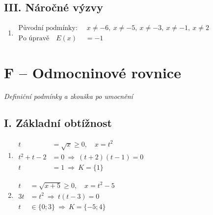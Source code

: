 \documentclass[11pt,a4paper]{article}
\begin{document}
\subsection*{III. Náročné výzvy}
\begin{enumerate}[label={},itemsep=9pt]
\item[\textbf{E002}] \(\displaystyle \begin{aligned}\text{Původní podmínky: }&\ x\ne -6,\ x\ne -5,\ x\ne -3,\ x\ne -1,\ x\ne 2\\ \text{Po úpravě}\quad E(x)&=-1\end{aligned}\)\par
\end{enumerate}
\section*{F -- Odmocninové rovnice}
\textit{Definiční podmínky a zkouška po umocnění}
\subsection*{I. Základní obtížnost}
\begin{enumerate}[label={},itemsep=9pt]
\item[\textbf{F001}] \(\displaystyle \begin{aligned}t&=\sqrt x\ge0,\quad x=t^2\\t^2+t-2&=0\ \Rightarrow\ (t+2)(t-1)=0\\t&=1\ \Rightarrow\ K=\{1\}\end{aligned}\)\par
\item[\textbf{F002}] \(\displaystyle \begin{aligned}t&=\sqrt{x+5}\ge0,\quad x=t^2-5\\3t&=t^2\ \Rightarrow\ t(t-3)=0\\t&\in\{0;3\}\ \Rightarrow\ K=\{-5;4\}\end{aligned}\)\par
\end{enumerate}
\end{document}
